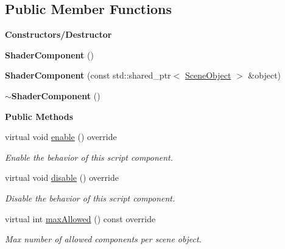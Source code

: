 \subsection*{Public Member Functions}
\begin{Indent}\textbf{ Constructors/\+Destructor}\par
\begin{DoxyCompactItemize}
\item 
\mbox{\label{classrev_1_1_shader_component_a31c8496549d26bfe858131fb0b938cef}} 
{\bfseries Shader\+Component} ()
\item 
\mbox{\label{classrev_1_1_shader_component_a81b60d2ec7a99e431beca4aa4fc2e8ec}} 
{\bfseries Shader\+Component} (const std\+::shared\+\_\+ptr$<$ \mbox{\hyperlink{classrev_1_1_scene_object}{Scene\+Object}} $>$ \&object)
\item 
\mbox{\label{classrev_1_1_shader_component_a6663f3fc549344fb69ac40e88af3e515}} 
{\bfseries $\sim$\+Shader\+Component} ()
\end{DoxyCompactItemize}
\end{Indent}
\begin{Indent}\textbf{ Public Methods}\par
\begin{DoxyCompactItemize}
\item 
\mbox{\label{classrev_1_1_shader_component_a53b8763be6b2c37b929c594555ab3943}} 
virtual void \mbox{\hyperlink{classrev_1_1_shader_component_a53b8763be6b2c37b929c594555ab3943}{enable}} () override
\begin{DoxyCompactList}\small\item\em Enable the behavior of this script component. \end{DoxyCompactList}\item 
\mbox{\label{classrev_1_1_shader_component_aad5ee2680a6ac13607b8a5f17cc6d454}} 
virtual void \mbox{\hyperlink{classrev_1_1_shader_component_aad5ee2680a6ac13607b8a5f17cc6d454}{disable}} () override
\begin{DoxyCompactList}\small\item\em Disable the behavior of this script component. \end{DoxyCompactList}\item 
\mbox{\label{classrev_1_1_shader_component_a1ec4c34b1c25eec0ec43d1653fa106a0}} 
virtual int \mbox{\hyperlink{classrev_1_1_shader_component_a1ec4c34b1c25eec0ec43d1653fa106a0}{max\+Allowed}} () const override
\begin{DoxyCompactList}\small\item\em Max number of allowed components per scene object. \end{DoxyCompactList}\end{DoxyCompactItemize}
\end{Indent}
